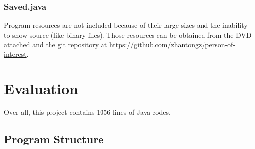 \documentclass[letterpaper, 12pt]{report}
\begin{document}
\section{Saved.java}


Program resources are not included because of their large sizes and the inability to show source (like binary files). Those resources can be obtained from the DVD attached and the git repository at \url{https://github.com/zhantongz/person-of-interest}.

\part{Evaluation}
Over all, this project contains 1056 lines of Java codes.
\chapter{Program Structure}

\end{document}
